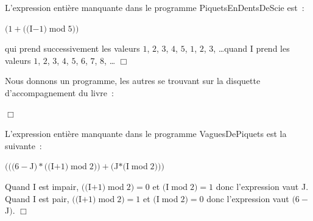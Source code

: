 \begin{corrige} {L'expression entière manquante dans le programme {\idt Piquets\-En\-Dents\-De\-Scie} est~:
\begin{center}
$(1 + ((${\idt I}$ - 1)\;${\mcl mod}$\;5))$
\end{center}
qui prend successivement les valeurs $1$, $2$, $3$, $4$, $5$, $1$, $2$, $3$, \dots quand {\idt I} prend les
valeurs $1$, $2$, $3$, $4$, $5$, $6$, $7$, $8$, \ldots
\noindent $\Box$}\end{corrige}
\begin{corrige} {Nous donnons un programme, les autres se trouvant sur la disquette
 d'accompagnement du livre~:

\noindent $\Box$}\end{corrige}
\begin{corrige} {L'expression entière manquante dans le programme {\idt VaguesDePiquets} est la suivante~:
\begin{center}
$(((6-${\idt J}$)\ast ((${\idt I}$+1)\;${\mcl mod}$\;2))+(${\idt J}$\ast(${\idt I}$\;${\mcl mod}$\;2)))$
\end{center}
Quand {\idt I} est impair, $((${\idt I}$+1)\;${\mcl mod}$\;2) = 0$ et $(${\idt I}$\;${\mcl mod}$\;2) = 1$
donc l'expression vaut {\idt J}. Quand {\idt I} est pair, $((${\idt I}$+1)\;${\mcl mod}$\;2) = 1$ et 
$(${\idt I}$\;${\mcl mod}$\;2) = 0$ donc l'expression vaut $(6-${\idt J}$)$.
$\Box$}\end{corrige}

